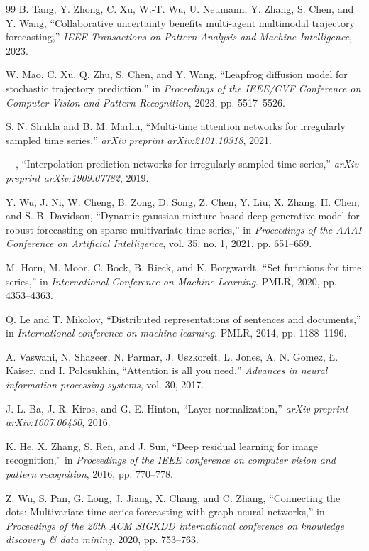 \documentclass[twocolumn]{article}
\begin{document}
\begin{thebibliography}{99}
 B. Tang, Y. Zhong, C. Xu, W.-T. Wu, U. Neumann, Y. Zhang, S. Chen, and Y. Wang, ``Collaborative uncertainty benefits multi-agent multimodal trajectory forecasting,'' \textit{IEEE Transactions on Pattern Analysis and Machine Intelligence}, 2023.

 W. Mao, C. Xu, Q. Zhu, S. Chen, and Y. Wang, ``Leapfrog diffusion model for stochastic trajectory prediction,'' in \textit{Proceedings of the IEEE/CVF Conference on Computer Vision and Pattern Recognition}, 2023, pp. 5517--5526.

 S. N. Shukla and B. M. Marlin, ``Multi-time attention networks for irregularly sampled time series,'' \textit{arXiv preprint arXiv:2101.10318}, 2021.

 ---, ``Interpolation-prediction networks for irregularly sampled time series,'' \textit{arXiv preprint arXiv:1909.07782}, 2019.

 Y. Wu, J. Ni, W. Cheng, B. Zong, D. Song, Z. Chen, Y. Liu, X. Zhang, H. Chen, and S. B. Davidson, ``Dynamic gaussian mixture based deep generative model for robust forecasting on sparse multivariate time series,'' in \textit{Proceedings of the AAAI Conference on Artificial Intelligence}, vol. 35, no. 1, 2021, pp. 651--659.

 M. Horn, M. Moor, C. Bock, B. Rieck, and K. Borgwardt, ``Set functions for time series,'' in \textit{International Conference on Machine Learning}. PMLR, 2020, pp. 4353--4363.

 Q. Le and T. Mikolov, ``Distributed representations of sentences and documents,'' in \textit{International conference on machine learning}. PMLR, 2014, pp. 1188--1196.

 A. Vaswani, N. Shazeer, N. Parmar, J. Uszkoreit, L. Jones, A. N. Gomez, \L. Kaiser, and I. Polosukhin, ``Attention is all you need,'' \textit{Advances in neural information processing systems}, vol. 30, 2017.

 J. L. Ba, J. R. Kiros, and G. E. Hinton, ``Layer normalization,'' \textit{arXiv preprint arXiv:1607.06450}, 2016.

 K. He, X. Zhang, S. Ren, and J. Sun, ``Deep residual learning for image recognition,'' in \textit{Proceedings of the IEEE conference on computer vision and pattern recognition}, 2016, pp. 770--778.

 Z. Wu, S. Pan, G. Long, J. Jiang, X. Chang, and C. Zhang, ``Connecting the dots: Multivariate time series forecasting with graph neural networks,'' in \textit{Proceedings of the 26th ACM SIGKDD international conference on knowledge discovery \& data mining}, 2020, pp. 753--763.


\end{thebibliography}
\end{document}
